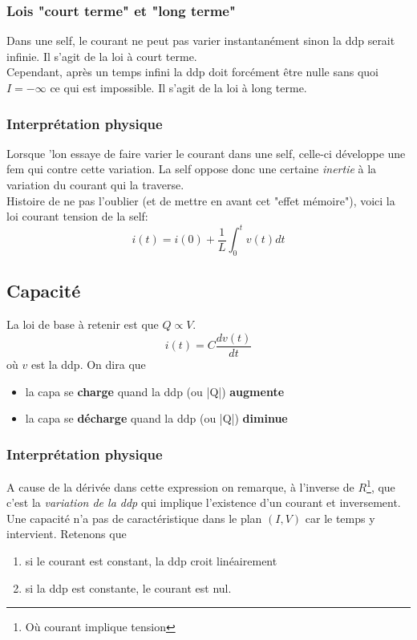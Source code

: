 \documentclass	[11pt, a4paper, openany]{book}
\begin{document}
	
	\subsubsection{Lois "court terme" et "long terme"}
	Dans une self, le courant ne peut pas varier instantanément sinon la ddp serait infinie. Il s'agit de la loi à court terme.\\
	Cependant, après un temps infini la ddp doit forcément être nulle sans quoi $I = - \infty$ ce qui est impossible. Il s'agit de la loi à long terme.
	
	\subsubsection{Interprétation physique}
	Lorsque 'lon essaye de faire varier le courant dans une self, celle-ci développe une fem qui contre cette variation. La self oppose donc une certaine \textit{inertie} à la variation du courant qui la traverse.\\
	
	Histoire de ne pas l'oublier (et de mettre en avant cet "effet mémoire"), voici la loi courant tension de la self:
	\begin{equation}
		i(t) = i(0) + \frac{1}{L}\int_0^t v(t) dt
	\end{equation}
	
	
	\subsection{Capacité}
	La loi de base à retenir est que $Q \propto V$.
	\begin{equation}
		i(t) = C \frac{dv(t)}{dt}
	\end{equation}
	où $v$ est la ddp. On dira que
	\begin{itemize}
		\item la capa se \textbf{charge} quand la ddp (ou |Q|) \textbf{augmente}
		\item la capa se \textbf{décharge} quand la ddp (ou |Q|) \textbf{diminue}
	\end{itemize}
	
	
	\subsubsection{Interprétation physique}
	A cause de la dérivée dans cette expression on remarque, à l'inverse de $R$\footnote{Où courant implique tension}, que c'est la \textit{variation de la ddp} qui implique l'existence d'un courant et inversement.\\
	Une capacité n'a pas de caractéristique dans le plan $(I,V)$ car le temps y intervient. Retenons que
	\begin{enumerate}
		\item si le courant est constant, la ddp croit linéairement
		\item si la ddp est constante, le courant est nul.
	\end{enumerate}
	
\end{document}
